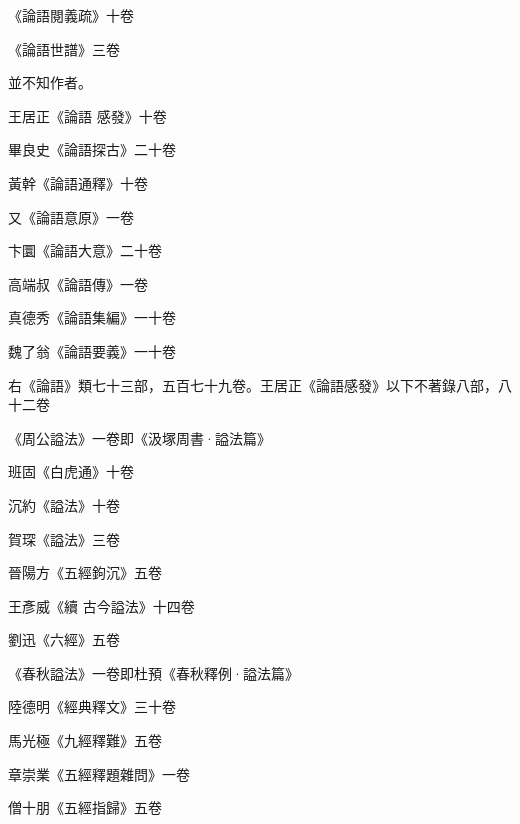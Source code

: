 \begin{pinyinscope}
 《論語閱義疏》十卷



 《論語世譜》三卷



 並不知作者。



 王居正《論語
 感發》十卷



 畢良史《論語探古》二十卷



 黃幹《論語通釋》十卷



 又《論語意原》一卷



 卞圜《論語大意》二十卷



 高端叔《論語傳》一卷



 真德秀《論語集編》一十卷



 魏了翁《論語要義》一十卷



 右《論語》類七十三部，五百七十九卷。王居正《論語感發》以下不著錄八部，八十二卷



 《周公謚法》一卷即《汲塚周書·謚法篇》



 班固《白虎通》十卷



 沉約《謚法》十卷



 賀琛《謚法》三卷



 晉陽方《五經鉤沉》五卷



 王彥威《續
 古今謚法》十四卷



 劉迅《六經》五卷



 《春秋謚法》一卷即杜預《春秋釋例·謚法篇》



 陸德明《經典釋文》三十卷



 馬光極《九經釋難》五卷



 章崇業《五經釋題雜問》一卷



 僧十朋《五經指歸》五卷




\end{pinyinscope}
